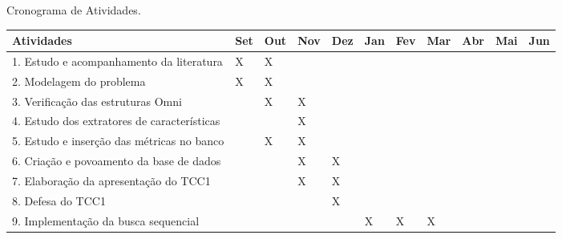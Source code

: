 \begin{quadro}[!htb]
    \caption{Cronograma de Atividades.\label{qua:cronograma}}
    \begin{tabular}{|p{5.0cm}|p{0.6cm}|p{0.6cm}|p{0.6cm}|p{0.6cm}|p{0.6cm}|p{0.6cm}|p{0.6cm}|p{0.6cm}|p{0.6cm}|p{0.6cm}|}
        \hline
        \textbf{Atividades} 						     & 	   \textbf{Set}      & \textbf{Out} & \textbf{Nov} & \textbf{Dez} & \textbf{Jan} & \textbf{Fev} & \textbf{Mar} & \textbf{Abr} & \textbf{Mai} & \textbf{Jun} \\
        \hline
        \footnotesize{1. Estudo e acompanhamento da literatura}		     & X	             & X            &  		   & 		  &  		 &   	        &   	       &   	      & 	     & 		     \\
        \hline
        \footnotesize{2. Modelagem do problema} 				     & X	             & X            &  		   & 		  &  		 &   	        &   	       &   	      & 	     &                \\
        \hline
	\footnotesize{3. Verificação das estruturas Omni} 			     &  	             & X            & X		   & 		  &  		 &   	        &   	       &   	      & 	     &                \\
        \hline
	\footnotesize{4. Estudo dos extratores de características} 		     &  	             &              & X		   & 		  &  		 &   	        &   	       &   	      & 	     & 		     \\
        \hline
	\footnotesize{5. Estudo e inserção das métricas no banco} 		     &  	             & X            & X		   &  		  &  		 &   	        &   	       &   	      & 	     & 		     \\
        \hline
	\footnotesize{6. Criação e povoamento da base de dados} 		     &  	             &              & X		   & X		  &  		 &   	        &   	       &   	      & 	     & 		     \\
        \hline
        \footnotesize{7. Elaboração da apresentação do TCC1}			     &  	             &              & X		   & X		  &  		 &   	        &   	       &   	      & 	     & 		     \\
        \hline        
        \footnotesize{8. Defesa do TCC1}                                             &  	             &              &  		   & X		  &  		 &   	        &   	       &   	      & 	     & 		     \\
        \hline
	\footnotesize{9. Implementação da busca sequencial} 			     &  	             &              &  		   & 		  & X		 & X	        & X 	       &   	      & 	     & 		     \\

\end{tabular}
\end{quadro}
